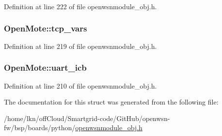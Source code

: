 Definition at line 222 of file openwsnmodule\+\_\+obj.\+h.

\subsubsection[{\texorpdfstring{tcp\+\_\+vars}{tcp_vars}}]{ Open\+Mote\+::tcp\+\_\+vars}\hypertarget{struct_open_mote_ae9aa5a246bdfe0db2d795dbf6acb9665}{}\label{struct_open_mote_ae9aa5a246bdfe0db2d795dbf6acb9665}


Definition at line 219 of file openwsnmodule\+\_\+obj.\+h.

\subsubsection[{\texorpdfstring{uart\+\_\+icb}{uart_icb}}]{ Open\+Mote\+::uart\+\_\+icb}\hypertarget{struct_open_mote_a4099b81ba7292a13c29f49b062a98ce6}{}\label{struct_open_mote_a4099b81ba7292a13c29f49b062a98ce6}


Definition at line 210 of file openwsnmodule\+\_\+obj.\+h.



The documentation for this struct was generated from the following file\+:\begin{DoxyCompactItemize}
\item 
/home/lkn/off\+Cloud/\+Smartgrid-\/code/\+Git\+Hub/openwsn-\/fw/bsp/boards/python/\hyperlink{openwsnmodule__obj_8h}{openwsnmodule\+\_\+obj.\+h}\end{DoxyCompactItemize}
